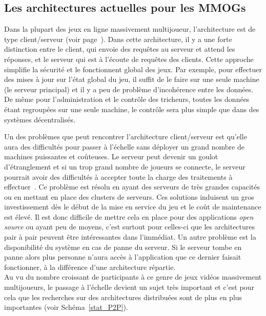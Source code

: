 	\subsection{Les architectures actuelles pour les MMOGs}
	\par Dans la plupart des jeux en ligne massivement multijoueur, l'architecture est de type client/serveur (voir page~\pageref{P2P/ClServ}). Dans cette architecture, il y a une forte distinction entre le client, qui envoie des requêtes au serveur et attend les réponses, et le serveur qui est à l'écoute de requêtes des clients. Cette approche simplifie la sécurité et le fonctionnent global des jeux. Par exemple, pour effectuer des mises à jour sur l'état global du jeu, il suffit de le faire sur une seule machine (le serveur principal) et il y a peu de problème d'incohérence entre les données. De même pour l'administration et le contrôle des tricheurs, toutes les données étant regroupées sur une seule machine, le contrôle sera plus simple que dans des systèmes décentralisés. \\
	\par Un des problèmes que peut rencontrer l'architecture client/serveur est qu'elle aura des difficultés pour passer à l'échelle sans déployer un grand nombre de machines puissantes et coûteuses. Le serveur peut devenir un goulot d'étranglement et si un trop grand nombre de joueurs se connecte, le serveur pourrait avoir des difficultés à accepter toute la charge des traitements à effectuer~\cite{1198269}. Ce problème est résolu en ayant des serveurs de très grandes capacités ou en mettant en place des clusters de serveurs. Ces solutions induisent un gros investissement dès le début de la mise en service du jeu et le coût de maintenance est élevé. Il est donc difficile de mettre cela en place pour des applications \textit{open source} ou ayant peu de moyens, c'est surtout pour celles-ci que les architectures pair à pair peuvent être intéressantes dans l'immédiat. Un autre problème est la disponibilité du système en cas de panne du serveur. Si le serveur tombe en panne alors plus personne n'aura accès à l'application que ce dernier faisait fonctionner, à la différence d'une architecture répartie. \\
	Au vu du nombre croissant de participants à ce genre de jeux vidéos massivement multijoueurs, le passage à l'échelle devient un sujet très important et c'est pour cela que les recherches sur des architectures distribuées sont de plus en plus importantes (voir Schéma~\ref{stat_P2P}). \\
